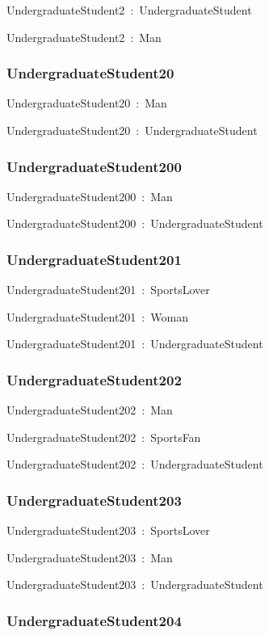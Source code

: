 \documentclass{article}
\begin{document}
UndergraduateStudent2~:~UndergraduateStudent

UndergraduateStudent2~:~Man

\subsubsection*{UndergraduateStudent20}

UndergraduateStudent20~:~Man

UndergraduateStudent20~:~UndergraduateStudent

\subsubsection*{UndergraduateStudent200}

UndergraduateStudent200~:~Man

UndergraduateStudent200~:~UndergraduateStudent

\subsubsection*{UndergraduateStudent201}

UndergraduateStudent201~:~SportsLover

UndergraduateStudent201~:~Woman

UndergraduateStudent201~:~UndergraduateStudent

\subsubsection*{UndergraduateStudent202}

UndergraduateStudent202~:~Man

UndergraduateStudent202~:~SportsFan

UndergraduateStudent202~:~UndergraduateStudent

\subsubsection*{UndergraduateStudent203}

UndergraduateStudent203~:~SportsLover

UndergraduateStudent203~:~Man

UndergraduateStudent203~:~UndergraduateStudent

\subsubsection*{UndergraduateStudent204}
\end{document}

